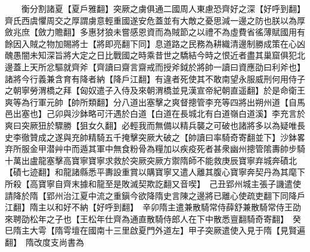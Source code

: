 　　衡分割諸夏【夏戶雅翻】突厥之虜俱通二國周人東慮恐齊好之深【好呼到翻】齊氏西虞懼周交之厚謂虜意輕重國遂安危蓋並有大敵之憂思減一邊之防也朕以為厚斂兆庶【斂力贍翻】多惠犲狼未嘗感恩資而為賊節之以禮不為虛費省徭薄賦國用有餘因入賊之物加賜將士【將即亮翻下同】息道路之民務為耕織清邊制勝成策在心凶醜愚闇未知深旨將大定之日比戰國之時乘昔世之驕結今時之恨近者盡其巢窟俱犯北邊蓋上天所忿驅就齊斧【齊讀曰齋言齋戒而授斧鉞於將帥一讀曰資應劭曰利斧也】諸將今行義兼含育有降者納【降戶江翻】有違者死使其不敢南望永服威刑何用侍子之朝寧勞渭橋之拜【匈奴遣子入侍及來朝渭橋並見漢宣帝紀朝直遥翻】於是命衛王爽等為行軍元帥【帥所類翻】分八道出塞擊之爽督摠管李充等四將出朔州道【自馬邑出塞也】己卯與沙鉢略可汗遇於白道【白道在長城北有白道嶺白道溪】李充言於爽曰突厥狃於驟勝【狙女久翻】必輕我而無備以精兵襲之可破也諸將多以為疑唯長史李徹贊成之遂與充帥精騎五千掩擊突厥大破之【帥讀曰率騎奇寄翻並下】沙鉢畧弃所服金甲潜艸中而遁其軍中無食粉骨為糧加以疾疫死者甚衆幽州摠管隂夀帥步騎十萬出盧龍塞擊高寶寧寶寧求救於突厥突厥方禦隋師不能救庚辰寶寧弃城奔磧北【磧七迹翻】和龍諸縣悉平夀設重賞以購寶寧又遣人離其腹心寶寧奔契丹為其麾下所殺【高寶寧自齊末據和龍至是敗滅契欺訖翻又音喫】　己丑郢州城主張子譏遣使請降於隋【郢州治江夏中流之重鎭今欲降隋史言陳之邊將已離心使疏吏翻下同降戶江翻】隋主以和好不納【好呼到翻】　辛卯隋主遣兼散騎常侍薛舒兼散騎常侍王劭來聘劭松年之子也【王松年仕齊為通直散騎侍郎人在下中散悉亶翻騎奇寄翻】　癸巳隋主大雩【隋雩壇在國南十三里啟夏門外道左】甲子突厥遣使入見于隋【見賢遍翻】　隋改度支尚書為

